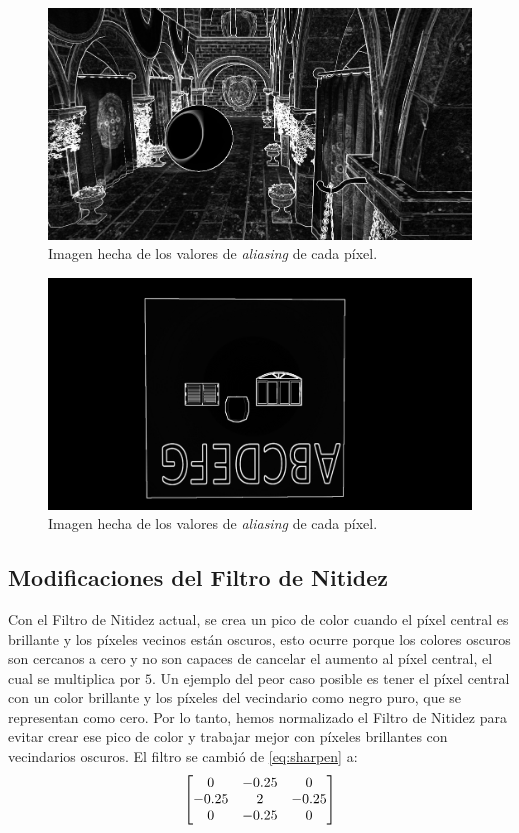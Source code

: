 \documentclass[pregrado]{tesis-usb} %
\begin{document}
\begin{figure}[H]
	\centering
	\includegraphics[scale=0.2]{images/aliased_value_example_2_temporal.png}
	\caption{Imagen hecha de los valores de \textit{aliasing} de cada píxel.}\label{fig:aliasedval2}
\end{figure}

\begin{figure}[H]
	\centering
	\includegraphics[scale=0.2]{images/aliased_value_example_3_temporal.png}
	\caption{Imagen hecha de los valores de \textit{aliasing} de cada píxel.}\label{fig:aliasedval3}
\end{figure}

\subsection{Modificaciones del Filtro de Nitidez}
Con el Filtro de Nitidez actual, se crea un pico de color cuando el píxel central es brillante y los píxeles vecinos están oscuros, esto ocurre porque los colores oscuros son cercanos a cero y no son capaces de cancelar el aumento al píxel central, el cual se multiplica por $5$. Un ejemplo del peor caso posible es tener el píxel central con un color brillante y los píxeles del vecindario como negro puro, que se representan como cero. Por lo tanto, hemos normalizado el Filtro de Nitidez para evitar crear ese pico de color y trabajar mejor con píxeles brillantes con vecindarios oscuros. El filtro se cambió de \ref{eq:sharpen} a:
\begin{equation} \label{eq:new_sharpen}
\centering
\begin{bmatrix*}[c]
0 & -0.25 &  0 \\
-0.25  &  2 & -0.25  \\
0 & -0.25  &  0
\end{bmatrix*}
\end{equation}
\end{document}
